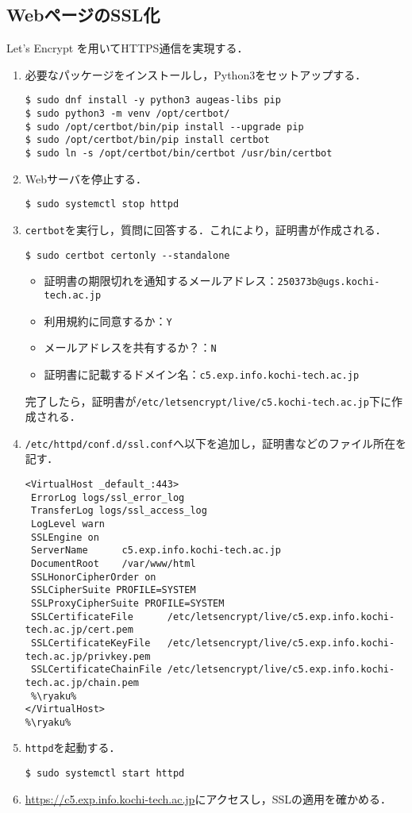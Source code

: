 \subsection{WebページのSSL化}
Let's Encrypt を用いてHTTPS通信を実現する．
\begin{enumerate}
    \item 必要なパッケージをインストールし，Python3をセットアップする．
          \begin{lstlisting}
$ sudo dnf install -y python3 augeas-libs pip
$ sudo python3 -m venv /opt/certbot/
$ sudo /opt/certbot/bin/pip install --upgrade pip
$ sudo /opt/certbot/bin/pip install certbot
$ sudo ln -s /opt/certbot/bin/certbot /usr/bin/certbot
\end{lstlisting}
    \item Webサーバを停止する．
          \begin{lstlisting}
$ sudo systemctl stop httpd
\end{lstlisting}
    \item \texttt{certbot}を実行し，質問に回答する．これにより，証明書が作成される．
          \begin{lstlisting}
$ sudo certbot certonly --standalone
\end{lstlisting}
          \begin{itemize}
              \item 証明書の期限切れを通知するメールアドレス：\texttt{250373b@ugs.kochi-tech.ac.jp}
              \item 利用規約に同意するか：\texttt{Y}
              \item メールアドレスを共有するか？：\texttt{N}
              \item 証明書に記載するドメイン名：\texttt{c5.exp.info.kochi-tech.ac.jp}
          \end{itemize}
          完了したら，証明書が\texttt{/etc/letsencrypt/live/c5.kochi-tech.ac.jp}下に作成される．
    \item \texttt{/etc/httpd/conf.d/ssl.conf}へ以下を追加し，証明書などのファイル所在を記す．
          \begin{lstlisting}[style=file,caption={\ttfamily /etc/httpd/conf.d/ssl.conf}]
%\ryaku%
<VirtualHost _default_:443>
 ErrorLog logs/ssl_error_log
 TransferLog logs/ssl_access_log
 LogLevel warn
 SSLEngine on
 ServerName      c5.exp.info.kochi-tech.ac.jp
 DocumentRoot    /var/www/html
 SSLHonorCipherOrder on
 SSLCipherSuite PROFILE=SYSTEM
 SSLProxyCipherSuite PROFILE=SYSTEM
 SSLCertificateFile      /etc/letsencrypt/live/c5.exp.info.kochi-tech.ac.jp/cert.pem
 SSLCertificateKeyFile   /etc/letsencrypt/live/c5.exp.info.kochi-tech.ac.jp/privkey.pem
 SSLCertificateChainFile /etc/letsencrypt/live/c5.exp.info.kochi-tech.ac.jp/chain.pem        
 %\ryaku%
</VirtualHost>
%\ryaku%
    \end{lstlisting}
    \item \texttt{httpd}を起動する．
          \begin{lstlisting}
$ sudo systemctl start httpd
\end{lstlisting}
    \item \url{https://c5.exp.info.kochi-tech.ac.jp}にアクセスし，SSLの適用を確かめる．
\end{enumerate}